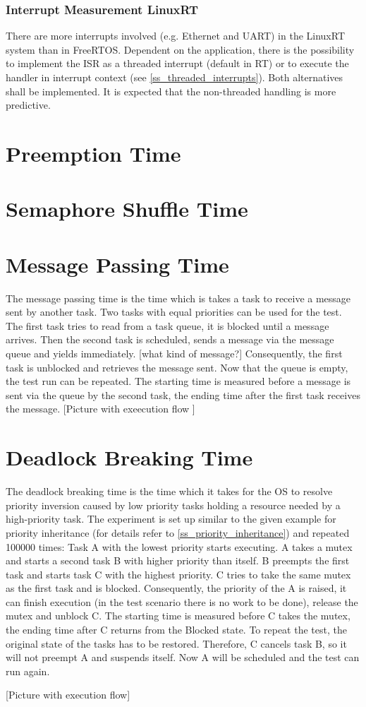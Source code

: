 \subsubsection{Interrupt Measurement LinuxRT}
There are more interrupts involved (e.g. Ethernet and \ac{UART}) in the LinuxRT system than in FreeRTOS.
Dependent on the application, there is the possibility to implement the \ac{ISR} as a threaded interrupt (default in RT) or to execute the handler in interrupt context (see \ref{ss_threaded_interrupts}).
Both alternatives shall be implemented.
It is expected that the non-threaded handling is more predictive.
 
\section{Preemption Time}
\section{Semaphore Shuffle Time}
\section{Message Passing Time}
The message passing time is the time which is takes a task to receive a message sent by another task.
Two tasks with equal priorities can be used for the test.
The first task tries to read from a task queue, it is blocked until a message arrives.
Then the second task is scheduled, sends a message via the message queue and yields immediately. [what kind of message?] 
Consequently, the first task is unblocked and retrieves the message sent.
Now that the queue is empty, the test run can be repeated.
The starting time is measured before a message is sent via the queue by the second task, the ending time after the first task receives the message.
[Picture with exeecution flow ]

\section{Deadlock Breaking Time}
The deadlock breaking time is the time which it takes for the \ac{OS} to resolve priority inversion caused by low priority tasks holding a resource needed by a high-priority task. 
The experiment is set up similar to the given example for priority inheritance (for details refer to \ref{ss_priority_inheritance}) and repeated 100000 times: 
Task A with the lowest priority starts executing.
A takes a mutex and starts a second task B with higher priority than itself.
B preempts the first task and starts task C with the highest priority. 
C tries to take the same mutex as the first task and is blocked.
Consequently, the priority of the A is raised, it can finish execution (in the test scenario there is no work to be done), release the mutex and unblock C.
The starting time is measured before C takes the mutex, the ending time after C returns from the Blocked state.
To repeat the test, the original state of the tasks has to be restored.
Therefore, C cancels task B, so it will not preempt A and suspends itself.
Now A will be scheduled and the test can run again.

[Picture with execution flow]
